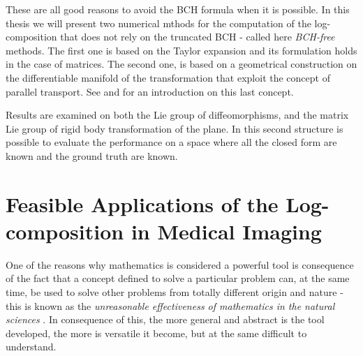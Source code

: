 These are all good reasons to avoid the BCH formula when it is possible. In this thesis we will present two numerical mthods for the computation of the log-composition that does not rely on the truncated BCH - called here \emph{BCH-free} methods. The first one is based on the Taylor expansion and its formulation holds in the case of matrices. The second one, is based on a geometrical construction on the differentiable manifold of the transformation that exploit the concept of parallel transport. See \cite{do1976differential} and \cite{misner1973gravitation} for an introduction on this last concept.

Results are examined on both the Lie group of diffeomorphisms, and the matrix Lie group of rigid body transformation of the plane. In this second structure is possible to evaluate the performance on a space where all the closed form are known and the ground truth are known.





\section{Feasible Applications of the Log-composition in Medical Imaging}\label{se:applications_log_com_in_med}
One of the reasons why mathematics is considered a powerful tool is consequence of the fact that a concept defined to solve a particular problem can, at the same time, be used to solve other problems from totally different origin and nature - this is known as the \emph{unreasonable effectiveness of mathematics in the natural sciences} \cite{wigner1960unreasonable}. In consequence of this, the more general and abstract is the tool developed, the more is versatile it become, but at the same difficult to understand.


